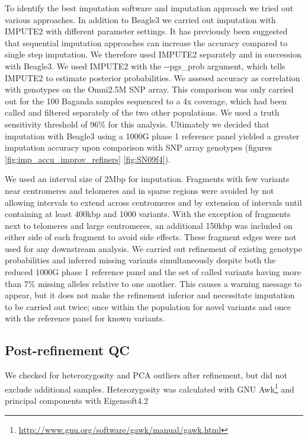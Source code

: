 To identify the best imputation software and imputation approach we tried out various approaches. In addition to Beagle3 we carried out imputation with IMPUTE2\cite{10.1371/journal.pgen.1000529} with different parameter settings. It has previously been suggested that sequential imputation approaches can increase the accuracy compared to single step imputation.\cite{Pasaniuc2012}
We therefore used IMPUTE2 separately and in succession with Beagle3. We used IMPUTE2 with the -{}-pgs\_prob argument, which tells IMPUTE2 to estimate posterior probabilities. We assesed accuracy as correlation with genotypes on the Omni2.5M SNP array. This comparison was only carried out for the 100 Baganda samples sequenced to a 4x coverage, which had been called and filtered separately of the two other populations. We used a truth sensitivity threshold of 96\% for this analysis.
Ultimately we decided that imputation with Beagle3\cite{Browning20071084} using a \gls{1000G} phase 1 reference panel yielded a greater imputation accuracy upon comparison with SNP array genotypes (figures \ref{fig:imp_accu_improv_refiners} \ref{fig:SN09f4}).



We used an interval size of 2\gls{Mbp} for imputation. Fragments with few variants near centromeres and telomeres and in sparse regions were avoided by not allowing intervals to extend across centromeres and by extension of intervals until containing at least 400\gls{kbp} and 1000 variants. With the exception of fragments next to telomeres and large centromeres, an additional 150\gls{kbp} was included on either side of each fragment to avoid side effects. These fragment edges were not used for any downstream analysis.
We carried out refinement of existing genotype probabilities and inferred missing variants simultaneously despite both the reduced \gls{1000G} phase 1 reference panel and the set of called variants having more than 7\% missing alleles relative to one another. This causes a warning message to appear, but it does not make the refinement inferior and necessitate imputation to be carried out twice; once within the population for novel variants and once with the reference panel for known variants.

\subsection{Post-refinement \gls{QC}}
We checked for heterozygosity and \gls{PCA} outliers after refinement, but did not exclude additional samples. Heterozygosity was calculated with GNU Awk\footnote{\url{http://www.gnu.org/software/gawk/manual/gawk.html}} and principal components with Eigensoft4.2\cite{10.1371/journal.pgen.0020190}\cite{Price2006}

